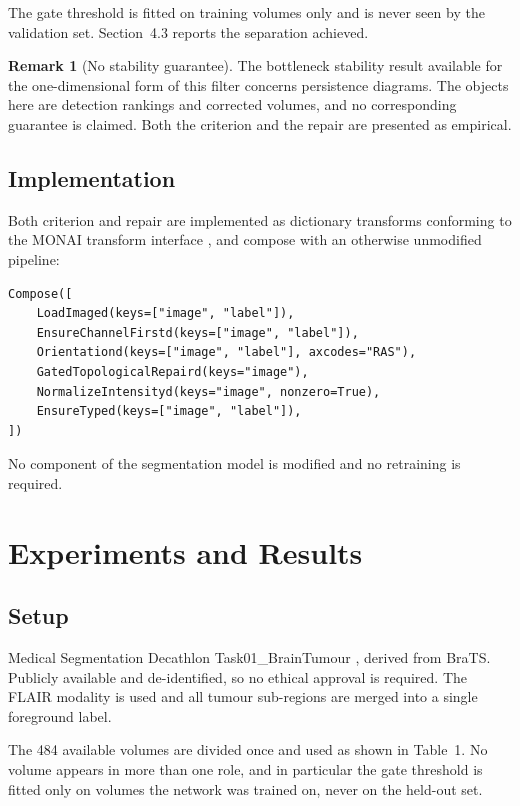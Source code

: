 \documentclass[12pt]{article}
\theoremstyle{definition}
\newtheorem{remark}{Remark}[section]
\theoremstyle{plain}
\begin{document}
The gate threshold is fitted on training volumes only and is never seen by the
validation set. Section~4.3 reports the separation achieved.

\begin{remark}[No stability guarantee]
The bottleneck stability result available for the one-dimensional form of this filter
concerns persistence diagrams. The objects here are detection rankings and corrected
volumes, and no corresponding guarantee is claimed. Both the criterion and the repair
are presented as empirical.
\end{remark}

\subsection{Implementation}

Both criterion and repair are implemented as dictionary transforms conforming to the
MONAI transform interface \cite{cardoso2022monai}, and compose with an otherwise
unmodified pipeline:

\begin{verbatim}
Compose([
    LoadImaged(keys=["image", "label"]),
    EnsureChannelFirstd(keys=["image", "label"]),
    Orientationd(keys=["image", "label"], axcodes="RAS"),
    GatedTopologicalRepaird(keys="image"),
    NormalizeIntensityd(keys="image", nonzero=True),
    EnsureTyped(keys=["image", "label"]),
])
\end{verbatim}

No component of the segmentation model is modified and no retraining is required.

\section{Experiments and Results}

\subsection{Setup}

Medical Segmentation Decathlon Task01\_BrainTumour \cite{antonelli2021msd}, derived
from BraTS. Publicly available and de-identified, so no ethical approval is required.
The FLAIR modality is used and all tumour sub-regions are merged into a single
foreground label.

The 484 available volumes are divided once and used as shown in Table~1. No volume
appears in more than one role, and in particular the gate threshold is fitted only on
volumes the network was trained on, never on the held-out set.
\end{document}

